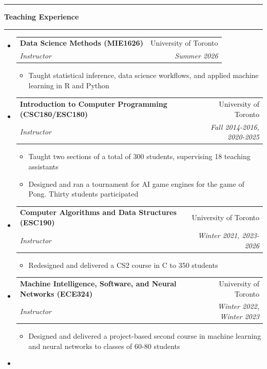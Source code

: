 \documentclass[letterpaper,11pt]{article}
\makeatletter
\newcommand{\resitem}[1]{\item #1 \vspace{-2pt}}
\newcommand{\resheading}[1]{%
  \vspace{10pt}%
  \noindent\textcolor{accent}{\rule{3pt}{12pt}}\hspace{6pt}%
  {\large \textbf{\textcolor{accent}{#1}}}%
  \vspace{2pt}%
  \par\noindent\textcolor{accent!30}{\rule{\textwidth}{0.5pt}}%
  \vspace{2pt}%
}
\newcommand{\ressubheading}[4]{
\begin{tabular*}{\linewidth}[t]{l@{\extracolsep{\fill}}r}
		\textbf{#1} & #2 \\
		\textit{\textcolor{accent}{#3}} & \textit{#4} \\
\end{tabular*}\vspace{-2pt}}
\makeatother
\begin{document}
\resheading{Teaching Experience}
\begin{itemize}
	\item
	\ressubheading{Data Science Methods (MIE1626)}{University of Toronto}{Instructor}{Summer 2026}
	\begin{itemize}
		\resitem{Taught statistical inference, data science workflows, and applied machine learning in R and Python}
	\end{itemize}

	\item
	\ressubheading{Introduction to Computer Programming (CSC180/ESC180)}{University of Toronto}{Instructor}{Fall 2014-2016, 2020-2025}
	\begin{itemize}
		\resitem{Taught two sections of a total of 300 students, supervising 18 teaching assistants}
		\resitem{Designed and ran a tournament for AI game engines for the game of Pong. Thirty students participated}
	\end{itemize}

\item 
	\ressubheading{Computer Algorithms and Data Structures (ESC190)}{University of Toronto}{Instructor}{Winter 2021, 2023-2026}
	\begin{itemize}
		\resitem{Redesigned and delivered a CS2 course in C to 350 students}
	\end{itemize}
\item
	\ressubheading{Machine Intelligence, Software, and Neural Networks (ECE324)}{University of Toronto}{Instructor}{Winter 2022, Winter 2023}
	\begin{itemize}
		\resitem{Designed and delivered a project-based second course in machine learning and neural networks to classes of 60-80 students}
	\end{itemize}
\item 


\end{itemize}
\end{document}
